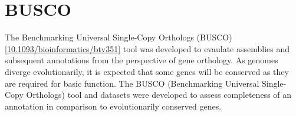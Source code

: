 \section{BUSCO}
The Benchmarking Universal Single-Copy Orthologs
(BUSCO)\ref{10.1093/bioinformatics/btv351} tool was developed to
evaulate assemblies and subsequent annotations from the perspective of
gene orthology. As genomes diverge evolutionarily, it is expected that
some genes will be conserved as they are required for basic
function. The BUSCO (Benchmarking Universal Single-Copy Orthologs)
tool and datasets were developed to assess completeness of an
annotation in comparison to evolutionarily conserved genes.
